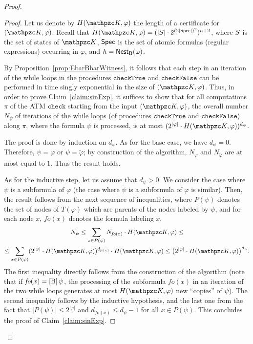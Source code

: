 \begin{proof}
\begin{proof}
Let us denote by $H(\Ku,\varphi)$ the length of a certificate for $(\Ku,\varphi)$. Recall that   $H(\Ku,\varphi)= (|\States|\cdot 2^{(2|\SPEC|)^2})^{h+2}$,
  where $S$ is the set of states of $\Ku$,  $\textsf{Spec}$ is the set of atomic formulas (regular expressions) occurring in $\varphi$, and $h=\operatorname{\mathsf{Nest}_B}(\varphi)$.

By Proposition~\ref{prop:EbarBbarWitness},  it follows that each  step in an iteration of the while loops in the procedures $\texttt{checkTrue}$ and $\texttt{checkFalse}$ can be performed in time singly exponential in the size of $(\Ku,\varphi)$.
 Thus, in order to prove Claim~\ref{claim:sinExp},  it suffices to show that
for all  computations $\pi$ of the ATM $\texttt{check}$ starting from the input $(\Ku,\varphi)$, the overall number $N_\psi$ of iterations of the while loops (of procedures $\texttt{checkTrue}$ and $\texttt{checkFalse}$) along $\pi$, where the formula $\psi$ is processed, is at most $(2^{|\varphi|}\cdot H(\Ku,\varphi))^{d_\psi}$. 

The proof is done by induction on $d_\psi$. As for the base case, we have $d_\psi = 0$. Therefore, $\psi=\varphi$ or $\psi=\widetilde{\varphi}$; by construction of the algorithm, $N_\varphi$ and $N_{\widetilde{\varphi}}$ are at most equal to $1$. Thus the result holds. 

As for the inductive step, let us assume that  $d_\psi > 0$. We consider the case where $\psi$ is a subformula of $\varphi$ (the case where $\widetilde{\psi}$ is a subformula of $\varphi$ is similar). Then, the result follows from the next sequence of inequalities, where $P(\psi)$ denotes the set of  nodes of $T(\varphi)$ which are parents of the nodes labeled by $\psi$, and for each node $x$, $\textit{fo}(x)$ denotes the formula labeling $x$.
\begin{multline*}
N_\psi  \leq  \sum_{x\in P(\psi)} N_{\textit{fo}(x)} \cdot H(\Ku,\varphi) \leq \\
\leq \sum_{x\in P(\psi)} (2^{|\varphi|}\cdot H(\Ku,\varphi))^{d_{\textit{fo}(x)}} \cdot H(\Ku,\varphi) \leq \big(2^{|\varphi|}\cdot H(\Ku,\varphi)\big)^{d_\psi}.
\end{multline*}
%
The first inequality directly follows from the construction of the algorithm (note that if $\textit{fo}(x)=\operatorname{\mathopen[ B \mathclose]}\psi$, the processing of the subformula $\textit{fo}(x)$ in an iteration of the two while loops generates at most  $H(\Ku,\varphi)$ new ``copies'' of $\psi$). The second inequality follows by the inductive hypothesis, and the last one from the fact that $|P(\psi)|\leq 2^{|\varphi|}$  and $d_{\textit{fo}(x)}\leq d_{\psi} -1$ for all $x\in P(\psi)$. This concludes the proof of Claim~\ref{claim:sinExp}. 
\end{proof}


\end{proof}
